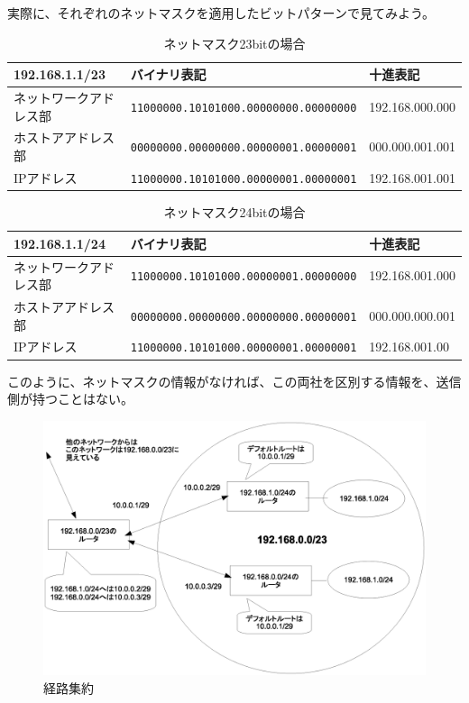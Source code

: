 実際に、それぞれのネットマスクを適用したビットパターンで見てみよう。

\begin{table}[hbtp] \caption{ネットマスク23bitの場合} \label{mask23}
\begin{center}
{\footnotesize
\begin{tabular}{lll} \toprule
192.168.1.1/23 & バイナリ表記 & 十進表記\\ \midrule
ネットワークアドレス部 & \verb+11000000.10101000.00000000.00000000+ &192.168.000.000\\
ホストアアドレス部 & \verb+00000000.00000000.00000001.00000001+ & 000.000.001.001\\
IPアドレス & \verb+11000000.10101000.00000001.00000001+ & 192.168.001.001\\ \bottomrule
\end{tabular}
}
\end{center}
\end{table}

\begin{table}[hbtp] \caption{ネットマスク24bitの場合} \label{mask24}
\begin{center}
{\footnotesize
\begin{tabular}{lll} \toprule
192.168.1.1/24 & バイナリ表記 & 十進表記\\ \midrule
ネットワークアドレス部 & \verb+11000000.10101000.00000001.00000000+ & 192.168.001.000\\
ホストアアドレス部 & \verb+00000000.00000000.00000000.00000001+ & 000.000.000.001\\
IPアドレス & \verb+11000000.10101000.00000001.00000001+ & 192.168.001.00\\ \bottomrule
\end{tabular}
}
\end{center}
\end{table}

このように、ネットマスクの情報がなければ、この両社を区別する情報を、送信側が持つことはない。

\begin{figure}[htbp]
	\includegraphics[width=12cm,clip]{draw/cidr.eps}
	\caption{経路集約}
	\label{fig:cidr}
\end{figure}

